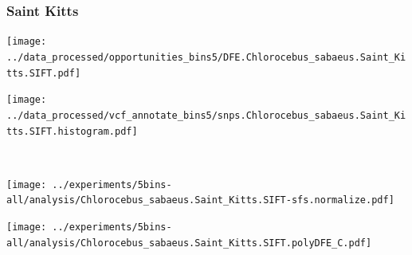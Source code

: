 \subsubsection{Saint Kitts}

\begin{minipage}{0.49\linewidth}
    \texttt{[image: ../data\_processed/opportunities\_bins5/DFE.Chlorocebus\_sabaeus.Saint\_Kitts.SIFT.pdf]}
\end{minipage}
\begin{minipage}{0.49\linewidth}
    \texttt{[image: ../data\_processed/vcf\_annotate\_bins5/snps.Chlorocebus\_sabaeus.Saint\_Kitts.SIFT.histogram.pdf]}
\end{minipage}
\\
\begin{minipage}{0.49\linewidth}
    \texttt{[image: ../experiments/5bins-all/analysis/Chlorocebus\_sabaeus.Saint\_Kitts.SIFT-sfs.normalize.pdf]}
\end{minipage}
\begin{minipage}{0.4\linewidth}
    \texttt{[image: ../experiments/5bins-all/analysis/Chlorocebus\_sabaeus.Saint\_Kitts.SIFT.polyDFE\_C.pdf]}
\end{minipage}
